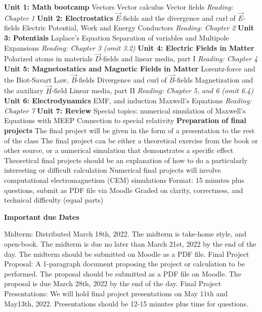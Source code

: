 \documentclass[10pt]{article}
\begin{document}
\begin{outline}[enumerate]
\1 \textbf{Unit 1: Math bootcamp}
\2 Vectors
\2 Vector calculus
\2 Vector fields
\2 \textit{Reading: Chapter 1}
\1 \textbf{Unit 2: Electrostatics}
\2 $\vec{E}$-fields and the divergence and curl of $\vec{E}$-fields
\2 Electric Potential, Work and Energy
\2 Conductors
\2 \textit{Reading: Chapter 2}
\1 \textbf{Unit 3: Potentials}
\2 Laplace's Equation
\2 Separation of variables and Multipole Expansions
\2 \textit{Reading: Chapter 3 (omit 3.2)}
\1 \textbf{Unit 4: Electric Fields in Matter}
\2 Polarized atoms in materials
\2 $\vec{D}$-fields and linear media, part I
\2 \textit{Reading: Chapter 4}
\1 \textbf{Unit 5: Magnetostatics and Magnetic Fields in Matter}
\2 Lorentz-force and the Biot-Savart Law, $\vec{B}$-fields
\2 Divergence and curl of $\vec{B}$-fields
\2 Magnetization and the auxiliary $\vec{H}$-field
\2 Linear media, part II
\2 \textit{Reading: Chapter 5, and 6 (omit 6.4)}
\1 \textbf{Unit 6: Electrodynamics}
\2 EMF, and induction
\2 Maxwell's Equations
\2 \textit{Reading: Chapter 7}
\1 \textbf{Unit 7: Review}
\2 Special topics: numerical simulation of Maxwell's Equations with MEEP
\2 Connection to special relativity
\2 \textbf{Preparation of final projects}
\3 The final project will be given in the form of a presentation to the rest of the class
\3 The final project can be either a theoretical exercise from the book or other source, or a numerical simulation that demonstrates a specific effect
\3 Theoretical final projects should be an explanation of how to do a particularly interesting or difficult calculation
\3 Numerical final projects will involve computational electromagnetism (CEM) simulations
\3 Format: 15 minutes plus questions, submit as PDF file via Moodle
\3 Graded on clarity, correctness, and technical difficulty (equal parts)
\end{outline}
\textbf{Important due Dates}
\begin{outline}
\1 Midterm: Distributed March 18th, 2022.  The midterm is take-home style, and open-book.  The midterm is due no later than March 21st, 2022 by the end of the day.  The midterm should be submitted on Moodle as a PDF file.
\1 Final Project Proposal: A 1-paragraph document proposing the project or calculation to be performed.  The proposal should be submitted as a PDF file on Moodle.  The proposal is due March 28th, 2022 by the end of the day.
\1 Final Project Presentations: We will hold final project presentations on May 11th and May13th, 2022.  Presentations should be 12-15 minutes plus time for questions.
\end{outline}
\end{document}
